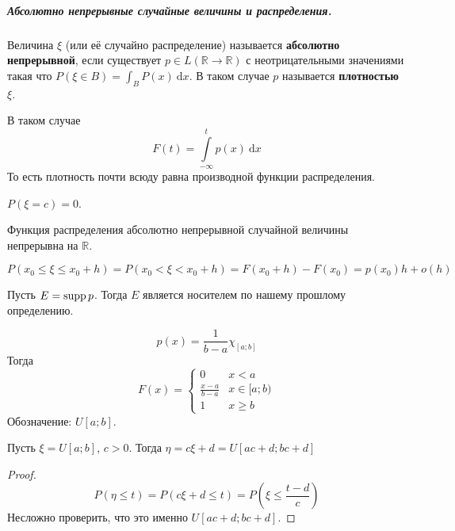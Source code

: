 \documentclass{article}
\begin{document}
    \subparagraph{Абсолютно непрерывные случайные величины и распределения.}
    \begin{definition}
        Величина $\xi$ (или её случайно распределение) называется \textbf{абсолютно непрерывной},  если существует $p\in L(\mathbb R\to\mathbb R)$ с неотрицательными значениями такая что $P(\xi\in B)=\int_BP(x)~\mathrm dx$. В таком случае $p$ называется \textbf{плотностью} $\xi$.
    \end{definition}
    \begin{property}
        В таком случае
        $$F(t)=\int\limits_{-\infty}^tp(x)~\mathrm dx$$
        То есть плотность почти всюду равна производной функции распределения.
    \end{property}
    \begin{property}
        $P(\xi=c)=0$.
    \end{property}
    \begin{property}
        Функция распределения абсолютно непрерывной случайной величины непрерывна на $\mathbb R$.
    \end{property}
    \begin{property}
        $$P(x_0\leqslant\xi\leqslant x_0+h)=P(x_0<\xi<x_0+h)=F(x_0+h)-F(x_0)=p(x_0)h+o(h)$$
    \end{property}
    \begin{property}
        Пусть $E=\operatorname{supp} p$. Тогда $E$ является носителем по нашему прошлому определению.
    \end{property}
    \begin{example}
        $$
        p(x)=\frac1{b-a}\chi_{[a;b]}
        $$
        Тогда
        $$
        F(x)=\begin{cases}
            0 & x<a\\
            \frac{x-a}{b-a} & x\in[a;b)\\
            1 & x\geqslant b
        \end{cases}
        $$
        Обозначение: $U[a;b]$.
    \end{example}
    \begin{claim}
        Пусть $\xi=U[a;b]$, $c>0$. Тогда $\eta=c\xi+d=U[ac+d;bc+d]$
    \end{claim}
    \begin{proof}
        $$
        P(\eta\leqslant t)=P(c\xi+d\leqslant t)=P\left(\xi\leqslant\frac{t-d}c\right)
        $$
        Несложно проверить, что это именно $U[ac+d;bc+d]$.
    \end{proof}
\end{document}
